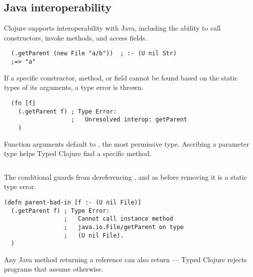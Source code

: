 \subsection{Java interoperability}
\label{sec:overviewjavainterop}

Clojure supports interoperability with Java, including the ability to
call constructors, invoke methods, and access fields.

\begin{verbatim}
  (.getParent (new File "a/b"))  ; :- (U nil Str)
  ;=> "a"
\end{verbatim}

If a specific constructor, method, or field cannot be found based on the
static types of its arguments, a type error is thrown.

\begin{verbatim}
  (fn [f] 
    (.getParent f) ; Type Error:
                   ;   Unresolved interop: getParent
    )
\end{verbatim}

Function arguments default to , the most permissive type. Ascribing
a parameter type helps Typed Clojure find a specific method.


\begin{exmp}
\inputminted[firstline=6,lastline=8]{clojure}{code/demo/src/demo/parent3.clj}
\end{exmp}


The conditional guards from dereferencing , and as before
removing it is a static type error.

\begin{verbatim}
(defn parent-bad-in [f :- (U nil File)]
  (.getParent f) ; Type Error:
                 ;   Cannot call instance method 
                 ;   java.io.File/getParent on type 
                 ;   (U nil File).
  )
\end{verbatim}

Any Java method returning a reference can also return  ---
Typed Clojure rejects programs that assume otherwise.

